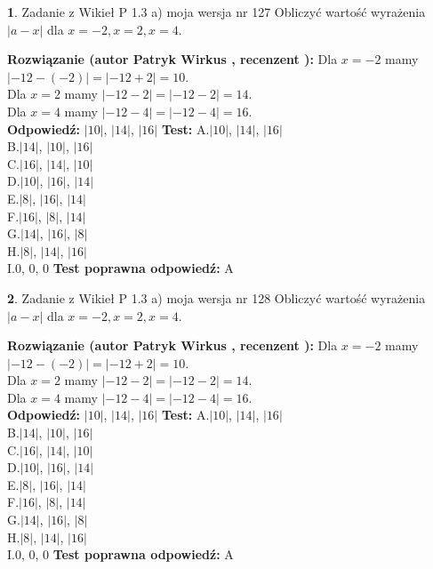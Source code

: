 \documentclass[12pt, a4paper]{article}
\theoremstyle{definition} %
\newtheorem{zad}{}
\newcommand{\zadStart}[1]{\begin{zad}#1\newline}
\newcommand{\zadStop}{\end{zad}}
\newcommand{\rozwStart}[2]{\noindent \textbf{Rozwiązanie (autor #1 , recenzent #2): }\newline}
\newcommand{\rozwStop}{\newline}
\newcommand{\odpStart}{\noindent \textbf{Odpowiedź:}\newline}
\newcommand{\odpStop}{\newline}
\newcommand{\testStart}{\noindent \textbf{Test:}\newline}
\newcommand{\testStop}{\newline}
\newcommand{\kluczStart}{\noindent \textbf{Test poprawna odpowiedź:}\newline}
\newcommand{\kluczStop}{\newline}
\begin{document}
\zadStart{Zadanie z Wikieł P 1.3 a) moja wersja nr 127}
Obliczyć wartość wyrażenia $|a - x|$ dla $x=-2,x=2,x=4$.
\zadStop
\rozwStart{Patryk Wirkus}{}
Dla $x = -2$ mamy $|-12 - (-2)| = |-12 + 2| = 10$.\\
Dla $x = 2$ mamy $|-12 - 2| = |-12 - 2| = 14$.\\
Dla $x = 4$ mamy $|-12 - 4| = |-12 - 4| = 16$.\\
\rozwStop
\odpStart
$|10|$, $|14|$, $|16|$
\odpStop
\testStart
A.$|10|$, $|14|$, $|16|$\\
B.$|14|$, $|10|$, $|16|$\\
C.$|16|$, $|14|$, $|10|$\\
D.$|10|$, $|16|$, $|14|$\\
E.$|8|$, $|16|$, $|14|$\\
F.$|16|$, $|8|$, $|14|$\\
G.$|14|$, $|16|$, $|8|$\\
H.$|8|$, $|14|$, $|16|$\\
I.$0$, $0$, $0$
\testStop
\kluczStart
A
\kluczStop



\zadStart{Zadanie z Wikieł P 1.3 a) moja wersja nr 128}
Obliczyć wartość wyrażenia $|a - x|$ dla $x=-2,x=2,x=4$.
\zadStop
\rozwStart{Patryk Wirkus}{}
Dla $x = -2$ mamy $|-12 - (-2)| = |-12 + 2| = 10$.\\
Dla $x = 2$ mamy $|-12 - 2| = |-12 - 2| = 14$.\\
Dla $x = 4$ mamy $|-12 - 4| = |-12 - 4| = 16$.\\
\rozwStop
\odpStart
$|10|$, $|14|$, $|16|$
\odpStop
\testStart
A.$|10|$, $|14|$, $|16|$\\
B.$|14|$, $|10|$, $|16|$\\
C.$|16|$, $|14|$, $|10|$\\
D.$|10|$, $|16|$, $|14|$\\
E.$|8|$, $|16|$, $|14|$\\
F.$|16|$, $|8|$, $|14|$\\
G.$|14|$, $|16|$, $|8|$\\
H.$|8|$, $|14|$, $|16|$\\
I.$0$, $0$, $0$
\testStop
\kluczStart
A
\kluczStop
\end{document}
